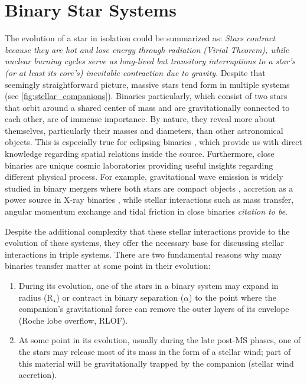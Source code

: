 \section{Binary Star Systems}\label{sec:binary_evolution}

The evolution of a star in isolation could be summarized as: {\it Stars contract because they are hot and lose energy through radiation (Virial Theorem), while nuclear burning cycles serve as long-lived but transitory interruptions to a star's (or at least its core's) inevitable contraction due to gravity}. Despite that seemingly straightforward picture, massive stars tend form in multiple systems (see \cref{fig:stellar_companions}). Binaries particularly, which consist of two stars that orbit around a shared center of mass and are gravitationally connected to each other, are of immense importance. By nature,  they reveal more about themselves, particularly their masses and diameters, than other astronomical objects. This is especially true for eclipsing binaries \citep{prvsa2016physics}, which provide us with direct knowledge regarding spatial relations inside the source. Furthermore, close binaries are unique cosmic laboratories providing useful insights regarding different physical process. For example, gravitational wave emission is widely studied in binary mergers where both stars are compact objects \citep{cutler1994gravitational,abbott2017gw170608,abbott2019gwtc}, accretion as a power source in X-ray binaries \citep{lewin1997x,reig2011x}, while stellar interactions such as mass transfer, angular momentum exchange and tidal friction in close binaries {\it citation to be}. 

Despite the additional complexity that these stellar interactions provide to the evolution of these systems, they offer the necessary base for discussing stellar interactions in triple systems.  There are two fundamental reasons why many binaries transfer matter at some point in their evolution:

\begin{enumerate}
    \item During its evolution, one of the stars in a binary system may expand in radius (R$_{\star}$) or contract in binary separation (${\alpha}$) to the point where the companion's gravitational force can remove the outer layers of its envelope (Roche lobe overflow, RLOF).
    \item At some point in its evolution, usually during the late post-MS phases, one of the stars may release most of its mass in the form of a stellar wind; part of this material will be gravitationally trapped by the companion (stellar wind accretion). 
\end{enumerate}

